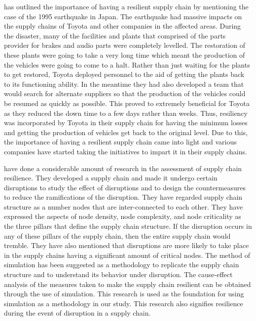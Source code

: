 \citep{Fujimoto2011} has outlined the importance of having a resilient supply chain by mentioning the case of the 1995 earthquake in Japan. The earthquake had massive impacts on the supply chains of Toyota and other companies in the affected areas. During the disaster, many of the facilities and plants that comprised of the parts provider for brakes and audio parts were completely levelled. The restoration of these plants were going to take a very long time which meant the production of the vehicles were going to come to a halt. Rather than just waiting for the plants to get restored, Toyota deployed personnel to the aid of getting the plants back to its functioning ability. In the meantime they had also developed a team that would search for alternate suppliers so that the production of the vehicles could be resumed as quickly as possible. This proved to extremely beneficial for Toyota as they reduced the down time to a few days rather than weeks. Thus, resiliency was incorporated by Toyota in their supply chain for having the minimum losses and getting the production of vehicles get back to the original level. Due to this, the importance of having a resilient supply chain came into light and various companies have started taking the initiatives to impart it in their supply chains.

\citep{Falasca2008} have done a considerable amount of research in the assessment of supply chain resilience. They developed a supply chain and made it undergo certain disruptions to study the effect of disruptions and to design the countermeasures to reduce the ramifications of the disruption. They have regarded supply chain structure as a number nodes that are inter-connected to each other. They have expressed the aspects of node density, node complexity, and node criticality as the three pillars that define the supply chain structure. If the disruption occurs in any of these pillars of the supply chain, then the entire supply chain would tremble. They have also mentioned that disruptions are more likely to take place in the supply chains having a significant amount of critical nodes. The method of simulation has been suggested as a methodology to replicate the supply chain structure and to understand its behavior under disruption. The cause-effect analysis of the measures taken to make the supply chain resilient can be obtained through the use of simulation. This research is used as the foundation for using simulation as a methodology in our study. This research also signifies resilience during the event of disruption in a supply chain.

